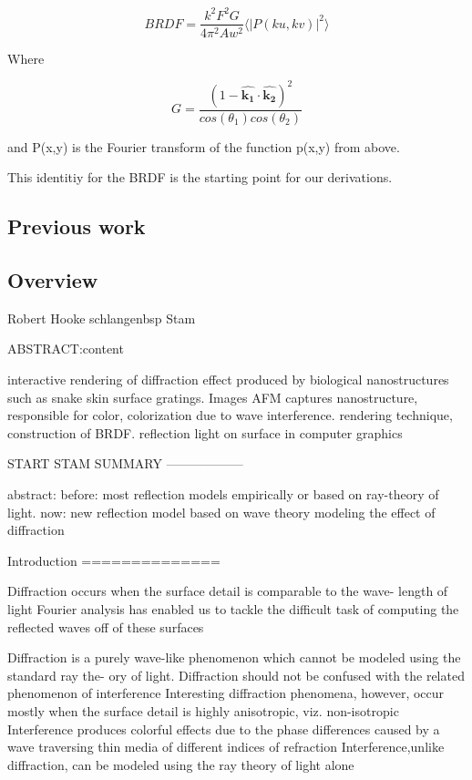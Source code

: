 \begin{equation}
    BRDF = \frac{k^2 F^2 G}{4\pi^2 A w^2} \langle \left|P(ku, kv)\right|^2\rangle
\end{equation}

Where 

\begin{equation}
    G = \frac{(1-\hat{\mathbf{k_1}}\cdot\hat{\mathbf{k_2}})^2}{cos(\theta_1)cos(\theta_2)}
\end{equation}

and P(x,y) is the Fourier transform of the function p(x,y) from above.

This identitiy for the BRDF is the starting point for our derivations.




\subsection{Previous work}
\subsection{Overview}


Robert Hooke
schlangenbsp
Stam 


ABSTRACT:content

interactive rendering of diffraction effect produced by biological nanostructures such as snake skin surface gratings.
Images AFM captures nanostructure, responsible for color, colorization due to wave interference.
rendering technique, construction of BRDF.
reflection light on surface in computer graphics


START STAM SUMMARY
------------------

abstract:
before: most reflection models empirically or based on ray-theory of light.
now: new reflection model based on wave theory modeling the effect of diffraction

Introduction
==============

Diffraction occurs when the surface detail is comparable to the wave- length of light
Fourier analysis has enabled us to tackle the difficult task of computing the reflected waves off of these surfaces

Diffraction is a purely wave-like phenomenon which cannot be modeled using the standard ray the- ory of light.
Diffraction should not be confused with the related phenomenon of interference
Interesting diffraction phenomena, however, occur mostly when the surface detail is highly anisotropic, viz. non-isotropic
Interference produces colorful effects due to the phase differences caused by a wave traversing thin media of different indices of refraction
Interference,unlike diffraction, can be modeled using the ray theory of light alone

